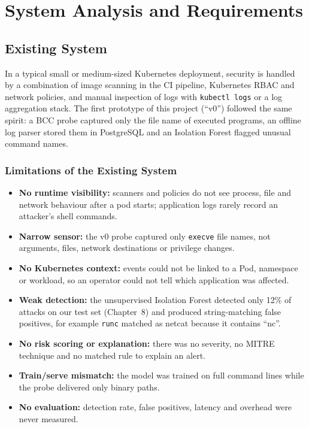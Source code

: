 \chapter{System Analysis and Requirements}

\section{Existing System}

In a typical small or medium-sized Kubernetes deployment, security is handled by a
combination of image scanning in the CI pipeline, Kubernetes RBAC and network
policies, and manual inspection of logs with \texttt{kubectl logs} or a log
aggregation stack. The first prototype of this project (``v0'') followed the same
spirit: a BCC probe captured only the file name of executed programs, an offline log
parser stored them in PostgreSQL and an Isolation Forest flagged unusual command names.

\subsection{Limitations of the Existing System}
\begin{itemize}
    \item \textbf{No runtime visibility:} scanners and policies do not see process, file
          and network behaviour after a pod starts; application logs rarely record an
          attacker's shell commands.
    \item \textbf{Narrow sensor:} the v0 probe captured only \texttt{execve} file names,
          not arguments, files, network destinations or privilege changes.
    \item \textbf{No Kubernetes context:} events could not be linked to a Pod, namespace
          or workload, so an operator could not tell which application was affected.
    \item \textbf{Weak detection:} the unsupervised Isolation Forest detected only 12\% of
          attacks on our test set (Chapter~8) and produced string-matching false positives,
          for example \texttt{runc} matched as netcat because it contains ``nc''.
    \item \textbf{No risk scoring or explanation:} there was no severity, no MITRE
          technique and no matched rule to explain an alert.
    \item \textbf{Train/serve mismatch:} the model was trained on full command lines while
          the probe delivered only binary paths.
    \item \textbf{No evaluation:} detection rate, false positives, latency and overhead
          were never measured.
\end{itemize}

